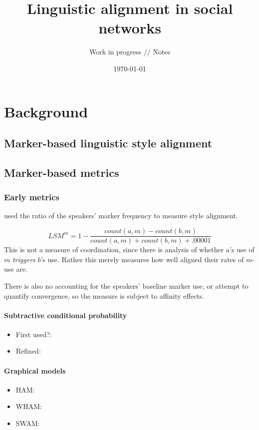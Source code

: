 \documentclass[12pt]{scrartcl}
\title{Linguistic alignment in social networks}
\subtitle{Work in progress // Notes}
\date{\today}
\begin{document}
\maketitle

\section{Background}

\subsection{Marker-based linguistic style alignment}
\cite{tausczik_psychological_2010,niederhoffer_linguistic_2002}

\subsection{Marker-based metrics}
\subsubsection{Early metrics}

\cite{ireland_language_2011} used the ratio of the speakers' marker frequency to measure style alignment.

\[
LSM^m = 1 - \frac{{count(a,m) - count(b,m)}}{count(a,m) + count(b,m) + .00001}
\]
This is not a measure of coordination, since there is analysis of whether $a$'s use of $m$ \emph{triggers} $b$'s use.
Rather this merely measures how well aligned their rates of $m$-use are.

There is also no accounting for the speakers' baseline marker use, or attempt to quantify convergence, so the measure is subject to affinity effects.

\paragraph{Subtractive conditional probability}
\begin{itemize}
	\item First used?: \cite{danescu-niculescu-mizil_mark_2011}
	\item Refined: \cite{danescu-niculescu-mizil_echoes_2012}
\end{itemize}


\paragraph{Graphical models}
\begin{itemize}
  \item HAM: \cite{doyle_investigating_2016}
  \item WHAM: \cite{doyle_robust_2016}
  \item SWAM: \cite{shin_alignment_2018}
\end{itemize}
\end{document}
